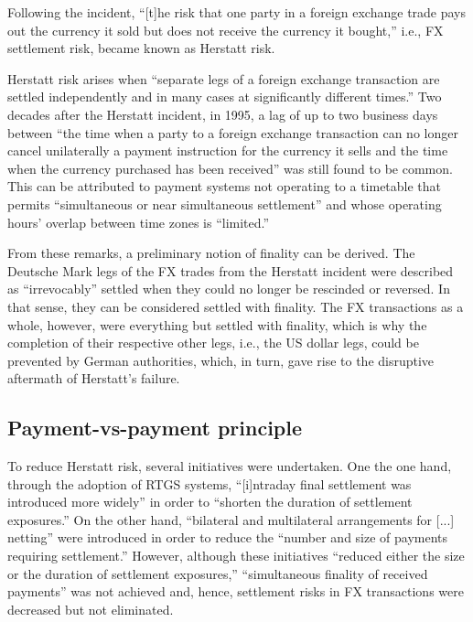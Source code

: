 Following the incident, ``[t]he risk that one party in a foreign exchange trade pays out the currency it sold but does not receive the currency it bought,'' i.e., FX settlement risk, became known as Herstatt risk. \autocite[57]{galati2002}

Herstatt risk arises when ``separate legs of a foreign exchange transaction are settled independently and in many cases at significantly different times.'' \autocite[56]{galati2002}
Two decades after the Herstatt incident, in 1995, a lag of up to two business days between ``the time when a party to a foreign exchange transaction can no longer cancel unilaterally a payment instruction for the currency it sells and the time when the currency purchased has been received'' was still found to be common. \autocite[56]{galati2002}
This can be attributed to payment systems not operating to a timetable that permits ``simultaneous or near simultaneous settlement'' and whose operating hours' overlap between time zones is ``limited.'' \autocite[56]{galati2002}

From these remarks, a preliminary notion of finality can be derived.
The Deutsche Mark legs of the FX trades from the Herstatt incident were described as ``irrevocably'' settled when they could no longer be rescinded or reversed.
In that sense, they can be considered settled with finality.
The FX transactions as a whole, however, were everything but settled with finality, which is why the completion of their respective other legs, i.e., the US dollar legs, could be prevented by German authorities, which, in turn, gave rise to the disruptive aftermath of Herstatt's failure.

\subsection{Payment-vs-payment principle}

To reduce Herstatt risk, several initiatives were undertaken.
One the one hand, through the adoption of RTGS systems, ``[i]ntraday final settlement was introduced more widely'' in order to ``shorten the duration of settlement exposures.'' \autocite[59]{galati2002}
On the other hand, ``bilateral and multilateral arrangements for [...] netting'' were introduced in order to reduce the ``number and size of payments requiring settlement.'' \autocite[59]{galati2002}
However, although these initiatives ``reduced either the size or the duration of settlement exposures,'' ``simultaneous finality of received payments'' was not achieved and, hence, settlement risks in FX transactions were decreased but not eliminated. \autocite[59]{galati2002}

